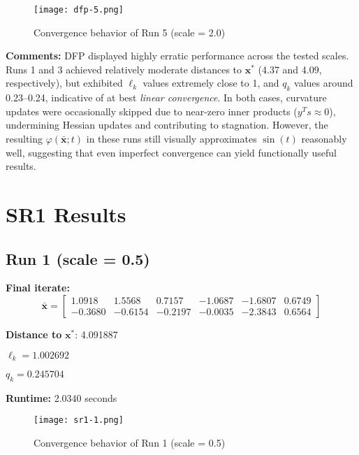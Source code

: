 \documentclass{article}
\begin{document}
\begin{figure}[H]
    \centering
    \texttt{[image: dfp-5.png]}
    \caption{Convergence behavior of Run 5 (scale = 2.0)}
    \label{fig:dfp-run5}
\end{figure}

\noindent
\textbf{Comments:} DFP displayed highly erratic performance across the tested scales. Runs 1 and 3 achieved relatively moderate distances to $\mathbf{x}^*$ (4.37 and 4.09, respectively), but exhibited $\ell_k$ values extremely close to 1, and $q_k$ values around 0.23–0.24, indicative of at best \textit{linear convergence}. In both cases, curvature updates were occasionally skipped due to near-zero inner products ($y^T s \approx 0$), undermining Hessian updates and contributing to stagnation.
However, the resulting $\varphi(\bar{\mathbf{x}}; t)$ in these runs still visually approximates $\sin(t)$ reasonably well, suggesting that even imperfect convergence can yield functionally useful results.




\section*{SR1 Results}

\subsection*{Run 1 (scale = 0.5)}
\vspace{1em}

\textbf{Final iterate:}
\[
\bar{\mathbf{x}} =
\begin{bmatrix}
1.0918 & 1.5568 & 0.7157 & -1.0687 & -1.6807 & 0.6749 \\
-0.3680 & -0.6154 & -0.2197 & -0.0035 & -2.3843 & 0.6564
\end{bmatrix}
\]

\vspace{0.5em}
\noindent
\textbf{Distance to } $\mathbf{x}^*$: 4.091887

\vspace{0.5em}
\noindent
$\ell_k = 1.002692$

\noindent
$q_k = 0.245704$

\vspace{0.5em}
\noindent
\textbf{Runtime:} 2.0340 seconds

\begin{figure}[H]
    \centering
    \texttt{[image: sr1-1.png]}
    \caption{Convergence behavior of Run 1 (scale = 0.5)}
\end{figure}
\end{document}
